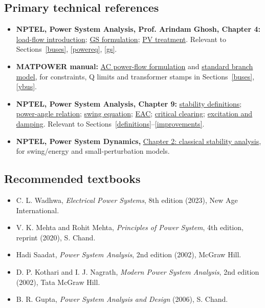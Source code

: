 \documentclass[11pt,a4paper]{article}
\begin{document}
\subsection{Primary technical references}
\begin{itemize}
\item \textbf{NPTEL, Power System Analysis, Prof. Arindam Ghosh, Chapter 4:} \href{https://archive.nptel.ac.in/content/storage2/courses/108104051/chapter_4/4_intro.html}{load-flow introduction}; \href{https://archive.nptel.ac.in/content/storage2/courses/108104051/chapter_4/4_5.html}{GS formulation}; \href{https://archive.nptel.ac.in/content/storage2/courses/108104051/chapter_4/4_7.html}{PV treatment}. Relevant to Sections~\ref{buses}, \ref{powereq}, \ref{gs}.
\item \textbf{MATPOWER manual:} \href{https://matpower.app/manual/matpower/ACPowerFlow.html}{AC power-flow formulation} and \href{https://matpower.app/manual/matpower/Branches.html}{standard branch model}, for constraints, Q limits and transformer stamps in Sections~\ref{buses}, \ref{ybus}.
\item \textbf{NPTEL, Power System Analysis, Chapter 9:} \href{https://archive.nptel.ac.in/content/storage2/courses/108104051/chapter_9/9_1.html}{stability definitions}; \href{https://archive.nptel.ac.in/content/storage2/courses/108104051/chapter_9/9_2.html}{power-angle relation}; \href{https://archive.nptel.ac.in/content/storage2/courses/108104051/chapter_9/9_3.html}{swing equation}; \href{https://archive.nptel.ac.in/content/storage2/courses/108104051/chapter_9/9_4.html}{EAC}; \href{https://archive.nptel.ac.in/content/storage2/courses/108104051/chapter_9/9_4a.html}{critical clearing}; \href{https://archive.nptel.ac.in/content/storage2/courses/108104051/chapter_9/9_5.html}{excitation and damping}. Relevant to Sections~\ref{definitions}--\ref{improvements}.
\item \textbf{NPTEL, Power System Dynamics,} \href{https://archive.nptel.ac.in/content/storage2/courses/108106026/chapter2.pdf}{Chapter 2: classical stability analysis}, for swing/energy and small-perturbation models.
\end{itemize}

\subsection{Recommended textbooks}
\begin{itemize}
\item C. L. Wadhwa, \emph{Electrical Power Systems}, 8th edition (2023), New Age International.
\item V. K. Mehta and Rohit Mehta, \emph{Principles of Power System}, 4th edition, reprint (2020), S. Chand.
\item Hadi Saadat, \emph{Power System Analysis}, 2nd edition (2002), McGraw Hill.
\item D. P. Kothari and I. J. Nagrath, \emph{Modern Power System Analysis}, 2nd edition (2002), Tata McGraw Hill.
\item B. R. Gupta, \emph{Power System Analysis and Design} (2006), S. Chand.
\end{itemize}
\end{document}
